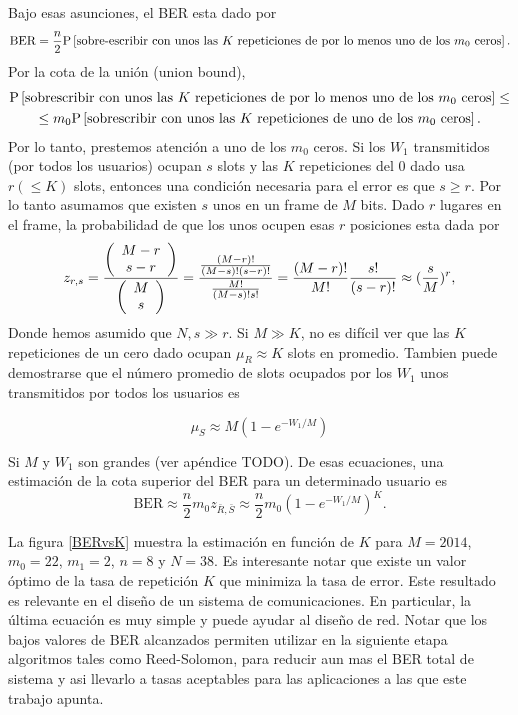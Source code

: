 Bajo esas asunciones, el BER esta dado por
\begin{equation}
\text{BER} = \frac{n}{2}\mathrm{P}\left[\text{sobre-escribir con unos las $K$ repeticiones de por lo menos uno de los $m_0$ ceros}\right].
\label{eq:ber_01}
\end{equation}
Por la cota de la unión (union bound), 
\begin{multline}
\mathrm{P}\left[\text{sobrescribir con unos las $K$ repeticiones de por lo menos uno de los $m_0$ ceros}\right]\leq \\
\leq m_0\mathrm{P}\left[\text{sobrescribir con unos las $K$ repeticiones de uno de los $m_0$ ceros}\right].
\label{eq:union_bound}
\end{multline}
Por lo tanto, prestemos atención a uno de los $m_0$ ceros. Si los $W_{1}$ transmitidos (por todos los usuarios) ocupan $s$ slots y las $K$ repeticiones del 0 dado usa $r ( \leq K)$ slots, entonces una condición necesaria para el error es que $s \geq r$. Por lo tanto asumamos que existen $s$ unos en un frame de $M$ bits. Dado $r$ lugares en el frame, la probabilidad de que los unos ocupen esas $r$ posiciones esta dada por 
\begin{equation}
z_{r,s} = \frac{\left(\begin{array}{c} M-r \\ s-r\end{array}\right)}{\left(\begin{array}{c} M \\ s\end{array}\right)}= \frac{\frac{(M-r)!}{(M-s)! (s-r)!}}{\frac{M!}{(M-s)!s!}} = \frac{(M-r)!}{M!}\frac{s!}{(s-r)!}\approx (\frac{s}{M})^r,
\end{equation}
Donde hemos asumido que $N,s\gg r$. Si $M \gg K$, no es difícil ver que las $K$ repeticiones de un cero dado ocupan $\mu_{R} \approx K$ slots en promedio. Tambien puede demostrarse que el número promedio de slots ocupados por los $W_{1}$ unos transmitidos por todos los usuarios es

\begin{equation}
\mu_{S} \approx M (1-e^{-W_1/M})
\end{equation}
 
Si $M$ y $W_{1}$ son grandes (ver apéndice TODO).
De esas ecuaciones, una estimación de la cota superior del BER para un determinado usuario es
\begin{equation}
\text{BER} \approx \frac{n}{2} m_0 z_{\bar{R},\bar{S}} \approx \frac{n}{2} m_0 \left(1-e^{-W_1/M}\right)^K.
\end{equation}

La figura \ref{BERvsK} muestra la estimación en función de $K$ para $M=2014$, $m_{0} = 22$, $m_{1} = 2$, $n = 8$ y $N=38$. Es interesante notar que existe un valor óptimo de la tasa de repetición $K$ que minimiza la tasa de error. Este resultado es relevante en el diseño de un sistema de comunicaciones. En particular, la última ecuación es muy simple y puede ayudar al diseño de red. Notar que los bajos valores de BER alcanzados permiten utilizar en la siguiente etapa algoritmos tales como Reed-Solomon, para reducir aun mas el BER total de sistema y asi llevarlo a tasas aceptables para las aplicaciones a las que este trabajo apunta.


